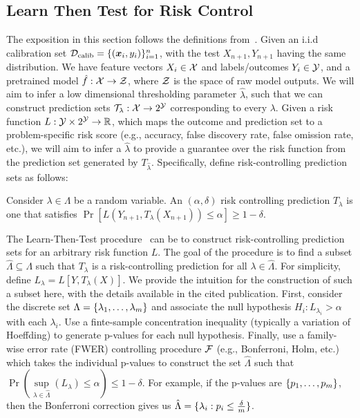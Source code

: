 \subsection{Learn Then Test for Risk Control}
The exposition in this section follows the definitions from~\citet{angelopoulos2021learn}.
Given an i.i.d calibration set ${\mathcal{D}}_{\text{calib}} = \{({\bm{x}}_i, y_i)\}_{i=1}^n$,
with the test $X_{n+1}, Y_{n+1}$ having the same distribution.
We have feature vectors $X_i \in {\mathcal{X}}$ and labels/outcomes $Y_i \in {\mathcal{Y}}$, and a pretrained model $\hat{f}: {\mathcal{X}} \rightarrow {\mathcal{Z}}$, where ${\mathcal{Z}}$ is the space of raw model outputs.
We will aim to infer a low dimensional thresholding parameter $\hat{\lambda}$, such that we can construct prediction sets ${\mathcal{T}}_\lambda: {\mathcal{X}} \rightarrow 2^{{\mathcal{Y}}}$ corresponding to every $\lambda$.
Given a risk function $L: {\mathcal{Y}} \times 2^{{\mathcal{Y}}} \rightarrow \mathbb{R}$, which maps the outcome and prediction set to a problem-specific risk score (e.g., accuracy, false discovery rate, false omission rate, etc.), we will aim to infer a $\hat{\lambda}$ to provide a guarantee over the risk function from the prediction set generated by $T_{\hat{\lambda}}$.
Specifically, define risk-controlling prediction sets as follows:
\begin{definition}
   Consider $\lambda \in \Lambda$ be a random variable. 
   An $(\alpha, \delta)$ risk controlling prediction $T_\lambda$ is one that satisfies $\Pr[L(Y_{n+1}, T_\lambda(X_{n+1})) \leq \alpha] \geq 1 - \delta$.
\end{definition}

The Learn-Then-Test procedure~\cite{angelopoulos2021learn} can be to construct risk-controlling prediction sets for an arbitrary risk function $L$.
The goal of the procedure is to find a subset $\hat{\Lambda} \subseteq \Lambda$ such that $T_\lambda$ is a risk-controlling prediction for all $\lambda \in \hat{\Lambda}$. 
For simplicity, define $L_\lambda = L[Y, T_\lambda(X)]$.
We provide the intuition for the construction of such a subset here, with the details available in the cited publication.
First, consider the discrete set $\Lambda = \{\lambda_1, \dots, \lambda_m\}$ and associate the null hypothesis $H_i: L_{\lambda_i} > \alpha$ with each $\lambda_i$.
Use a finte-sample concentration inequality (typically a variation of Hoeffding) to generate p-values for each null hypothesis.
Finally, use a family-wise error rate (FWER) controlling procedure ${\mathcal{F}}$ (e.g., Bonferroni, Holm, etc.) which takes the individual p-values to construct the set $\hat{\Lambda}$ such that $\Pr\left(\sup\limits_{\lambda \in \hat{\Lambda}}(L_{\lambda}) \leq \alpha \right) \leq 1-\delta$.
For example, if the p-values are $\{p_1, \dots, p_m\}$, then the Bonferroni correction gives us $\hat{\Lambda} = \{\lambda_i: p_i \leq \frac{\delta}{m}\}$.

